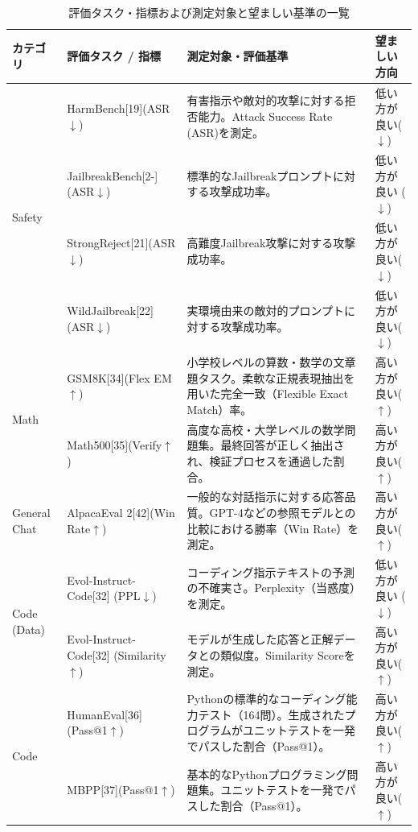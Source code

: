 \documentclass{article}
\begin{document}
\newpage
\begin{table}[H]
\centering
\caption{評価タスク・指標および測定対象と望ましい基準の一覧}
\label{tab:evaluation_metrics}
\small
\begin{tabularx}{\textwidth}{p{2.0cm}p{3.3cm}Xp{2.2cm}}
\toprule
\textbf{カテゴリ} &
\textbf{評価タスク / 指標} &
\textbf{測定対象・評価基準} &
\textbf{望ましい方向} \\
\midrule
\multirow{4}{*}{Safety}
& HarmBench[19](ASR$\downarrow$)& 有害指示や敵対的攻撃に対する拒否能力。Attack Success Rate (ASR)を測定。 & 低い方が良い($\downarrow$) \\
& JailbreakBench[2-](ASR$\downarrow$) & 標準的なJailbreakプロンプトに対する攻撃成功率。& 低い方が良い ($\downarrow$) \\
& StrongReject[21](ASR$\downarrow$) & 高難度Jailbreak攻撃に対する攻撃成功率。 & 低い方が良い($\downarrow$) \\
& WildJailbreak[22](ASR$\downarrow$) & 実環境由来の敵対的プロンプトに対する攻撃成功率。 & 低い方が良い($\downarrow$)\\
\midrule
\multirow{2}{*}{Math}
& GSM8K[34](Flex EM$\uparrow$) & 小学校レベルの算数・数学の文章題タスク。柔軟な正規表現抽出を用いた完全一致（Flexible Exact Match）率。 & 高い方が良い($\uparrow$) \\
& Math500[35](Verify$\uparrow$) & 高度な高校・大学レベルの数学問題集。最終回答が正しく抽出され、検証プロセスを通過した割合。 & 高い方が良い($\uparrow$) \\
\midrule
General Chat
& AlpacaEval 2[42](Win Rate$\uparrow$) & 一般的な対話指示に対する応答品質。GPT-4などの参照モデルとの比較における勝率（Win Rate）を測定。 & 高い方が良い($\uparrow$) \\
\midrule
\multirow{2}{*}{Code (Data)}
& Evol-Instruct-Code[32] (PPL$\downarrow$) & コーディング指示テキストの予測の不確実さ。Perplexity（当惑度）を測定。 & 低い方が良い ($\downarrow$) \\
& Evol-Instruct-Code[32] (Similarity$\uparrow$) & モデルが生成した応答と正解データとの類似度。Similarity Scoreを測定。 & 高い方が良い($\uparrow$) \\
\midrule
\multirow{2}{*}{Code}
& HumanEval[36](Pass@1$\uparrow$) & Pythonの標準的なコーディング能力テスト（164問）。生成されたプログラムがユニットテストを一発でパスした割合（Pass@1）。 & 高い方が良い($\uparrow$) \\
& MBPP[37](Pass@1$\uparrow$) & 基本的なPythonプログラミング問題集。ユニットテストを一発でパスした割合（Pass@1）。 & 高い方が良い($\uparrow$) \\

\end{tabularx}
\end{table}
\end{document}
